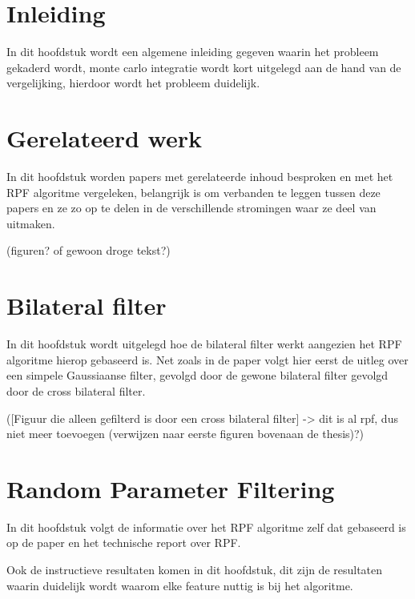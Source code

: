 \documentclass[master=cws, masteroption=mmc]{kulemt}
\begin{document}
    \mainmatter



    
    \chapter{Inleiding}
      In dit hoofdstuk wordt een algemene inleiding gegeven waarin het probleem gekaderd wordt, 
      monte carlo integratie wordt kort uitgelegd aan de hand van de vergelijking, 
      hierdoor wordt het probleem duidelijk.
      \par
      [Figuur die een scene toont gerenderd met monte carlo rendering, met een klein aantal samples]
      \par
      [Figuur die een scene toont gerenderd met monte carlo rendering, met een groot aantal samples]
    
    \chapter{Gerelateerd werk}
      In dit hoofdstuk worden papers met gerelateerde inhoud besproken en met het RPF algoritme vergeleken, 
      belangrijk is om verbanden te leggen tussen deze papers en ze zo op te delen in de verschillende stromingen waar ze deel van uitmaken.
      \par
      (figuren? of gewoon droge tekst?)
      
    \chapter{Bilateral filter}
      In dit hoofdstuk wordt uitgelegd hoe de bilateral filter werkt aangezien het RPF algoritme hierop gebaseerd is.
      Net zoals in de paper volgt hier eerst de uitleg over een simpele Gaussiaanse filter, 
      gevolgd door de gewone bilateral filter gevolgd door de cross bilateral filter.
      \par
      [Figuur die gefilterd is door een Gaussiaanse filter]
      \par
      [Figuur die gefilterd is door een bilateral filter]
      \par
      ([Figuur die alleen gefilterd is door een cross bilateral filter] -> dit is al rpf, dus niet meer toevoegen (verwijzen naar eerste figuren bovenaan de thesis)?)
      
    \chapter{Random Parameter Filtering}
      In dit hoofdstuk volgt de informatie over het RPF algoritme zelf dat gebaseerd is op de paper en het technische report over RPF.
      \par
      Ook de instructieve resultaten komen in dit hoofdstuk, dit zijn de resultaten waarin duidelijk wordt waarom elke feature nuttig is bij het algoritme.
      
\end{document}
